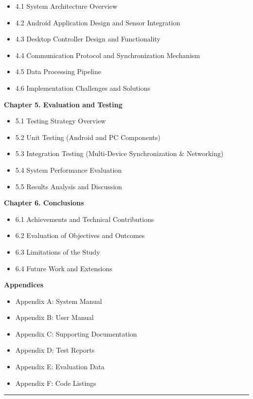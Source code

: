 \documentclass[12pt,a4paper]{report}
\begin{document}
\begin{itemize}
\item 4.1 System Architecture Overview
\item 4.2 Android Application Design and Sensor Integration
\item 4.3 Desktop Controller Design and Functionality
\item 4.4 Communication Protocol and Synchronization Mechanism
\item 4.5 Data Processing Pipeline
\item 4.6 Implementation Challenges and Solutions

\end{itemize}
\textbf{Chapter 5. Evaluation and Testing}

\begin{itemize}
\item 5.1 Testing Strategy Overview
\item 5.2 Unit Testing (Android and PC Components)
\item 5.3 Integration Testing (Multi-Device Synchronization & Networking)
\item 5.4 System Performance Evaluation
\item 5.5 Results Analysis and Discussion

\end{itemize}
\textbf{Chapter 6. Conclusions}

\begin{itemize}
\item 6.1 Achievements and Technical Contributions
\item 6.2 Evaluation of Objectives and Outcomes
\item 6.3 Limitations of the Study
\item 6.4 Future Work and Extensions

\end{itemize}
\textbf{Appendices}

\begin{itemize}
\item Appendix A: System Manual
\item Appendix B: User Manual
\item Appendix C: Supporting Documentation
\item Appendix D: Test Reports
\item Appendix E: Evaluation Data
\item Appendix F: Code Listings

\end{itemize}
\hrule
\end{document}
